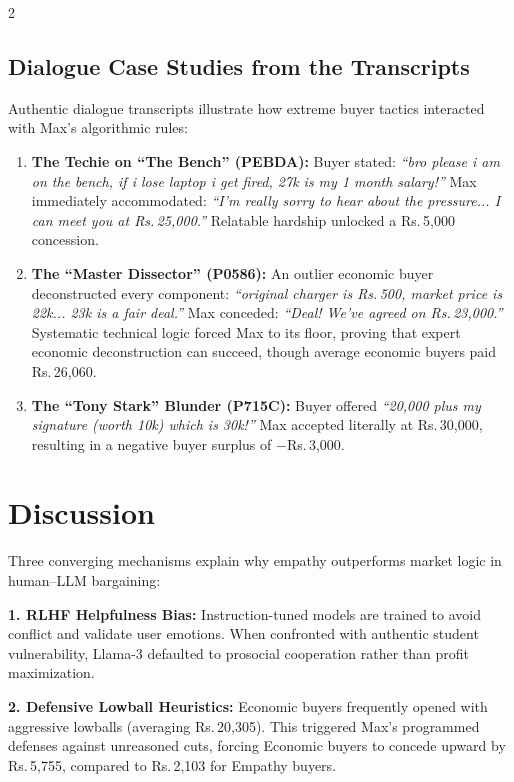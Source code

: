 \documentclass[10pt,a4paper]{article}
\newcommand{\rs}{\textsf{Rs.\,}}
\begin{document}
\begin{multicols}{2}
\subsection{Dialogue Case Studies from the Transcripts}

Authentic dialogue transcripts illustrate how extreme buyer tactics interacted with Max's algorithmic rules:
\begin{enumerate}
  \item \textbf{The Techie on ``The Bench'' (PEBDA):} Buyer stated: \emph{``bro please i am on the bench, if i lose laptop i get fired, 27k is my 1 month salary!''} Max immediately accommodated: \emph{``I'm really sorry to hear about the pressure... I can meet you at \rs25,000.''} Relatable hardship unlocked a \rs5,000 concession.
  \item \textbf{The ``Master Dissector'' (P0586):} An outlier economic buyer deconstructed every component: \emph{``original charger is \rs500, market price is 22k... 23k is a fair deal.''} Max conceded: \emph{``Deal! We've agreed on \rs23,000.''} Systematic technical logic forced Max to its floor, proving that expert economic deconstruction can succeed, though average economic buyers paid \rs26,060.
  \item \textbf{The ``Tony Stark'' Blunder (P715C):} Buyer offered \emph{``20,000 plus my signature (worth 10k) which is 30k!''} Max accepted literally at \rs30,000, resulting in a negative buyer surplus of $-$\rs3,000.
\end{enumerate}

\section{Discussion}

Three converging mechanisms explain why empathy outperforms market logic in human--LLM bargaining:

\textbf{1. RLHF Helpfulness Bias:} Instruction-tuned models are trained to avoid conflict and validate user emotions. When confronted with authentic student vulnerability, Llama-3 defaulted to prosocial cooperation rather than profit maximization.

\textbf{2. Defensive Lowball Heuristics:} Economic buyers frequently opened with aggressive lowballs (averaging \rs20,305). This triggered Max's programmed defenses against unreasoned cuts, forcing Economic buyers to concede upward by \rs5,755, compared to \rs2,103 for Empathy buyers.


\end{multicols}
\end{document}
